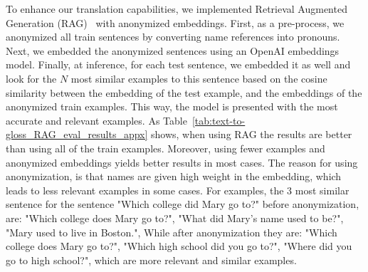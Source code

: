 To enhance our translation capabilities, we implemented Retrieval Augmented Generation (RAG)~\cite{lewis2020retrieval} with anonymized embeddings. First, as a pre-process, we anonymized all train sentences by converting name references into pronouns. Next, we embedded the anonymized sentences using an OpenAI embeddings model. Finally, at inference, for each test sentence, we embedded it as well and look for the $N$ most similar examples to this sentence based on the cosine similarity between the embedding of the test example, and the embeddings of the anonymized train examples. This way, the model is presented with the most accurate and relevant examples. As Table~\ref{tab:text-to-gloss_RAG_eval_results_appx} shows, when using RAG the results are better than using all of the train examples. Moreover, using fewer examples and anonymized embeddings yields better results in most cases. The reason for using anonymization, is that names are given high weight in the embedding, which leads to less relevant examples in some cases. For examples, the 3 most similar sentence for the sentence "Which college did Mary go to?" before anonymization, are: "Which college does Mary go to?", "What did Mary's name used to be?", "Mary used to live in Boston.", While after anonymization they are: "Which college does Mary go to?", "Which high school did you go to?", "Where did you go to high school?", which are more relevant and similar examples.
